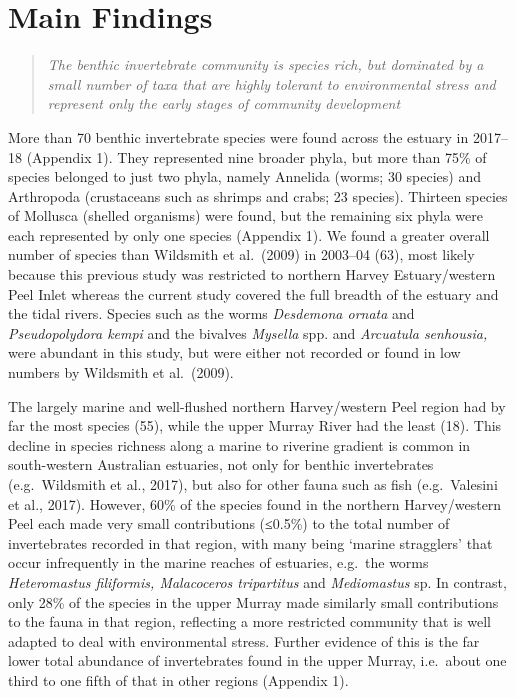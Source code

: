 \documentclass[
]{book}
\begin{document}
\hypertarget{main-findings}{%
\section{Main Findings}\label{main-findings}}

\begin{quote}
\emph{The benthic invertebrate community is species rich, but dominated by a small number of taxa that are highly tolerant to environmental stress and represent only the early stages of community development}
\end{quote}

More than 70 benthic invertebrate species were found across the estuary in 2017--18 (Appendix 1). They represented nine broader phyla, but more than 75\% of species belonged to just two phyla, namely Annelida (worms; 30 species) and Arthropoda (crustaceans such as shrimps and crabs; 23 species). Thirteen species of Mollusca (shelled organisms) were found, but the remaining six phyla were each represented by only one species (Appendix 1). We found a greater overall number of species than Wildsmith et al.~(2009) in 2003--04 (63), most likely because this previous study was restricted to northern Harvey Estuary/western Peel Inlet whereas the current study covered the full breadth of the estuary and the tidal rivers. Species such as the worms \emph{Desdemona ornata} and \emph{Pseudopolydora kempi} and the bivalves \emph{Mysella} spp. and \emph{Arcuatula senhousia,} were abundant in this study, but were either not recorded or found in low numbers by Wildsmith et al.~(2009).

The largely marine and well-flushed northern Harvey/western Peel region had by far the most species (55), while the upper Murray River had the least (18). This decline in species richness along a marine to riverine gradient is common in south-western Australian estuaries, not only for benthic invertebrates (e.g.~Wildsmith et al., 2017), but also for other fauna such as fish (e.g.~Valesini et al., 2017). However, 60\% of the species found in the northern Harvey/western Peel each made very small contributions (≤0.5\%) to the total number of invertebrates recorded in that region, with many being `marine stragglers' that occur infrequently in the marine reaches of estuaries, e.g.~the worms \emph{Heteromastus filiformis, Malacoceros tripartitus} and \emph{Mediomastus} sp. In contrast, only 28\% of the species in the upper Murray made similarly small contributions to the fauna in that region, reflecting a more restricted community that is well adapted to deal with environmental stress. Further evidence of this is the far lower total abundance of invertebrates found in the upper Murray, i.e.~about one third to one fifth of that in other regions (Appendix 1).~
\end{document}
